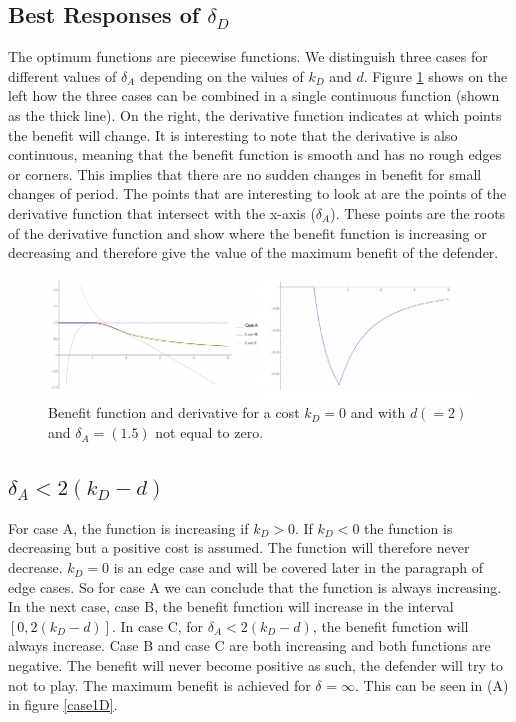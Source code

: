 \subsection{Best Responses of $\delta_{D}$}
The optimum functions are piecewise functions. We distinguish three cases for different values of $\delta_{A}$ depending on the values of $k_{D}$ and $d$. 
Figure \ref{cost0} shows on the left how the three cases can be combined in a single continuous function (shown as the thick line). On the right, the derivative function indicates at which points the benefit will change. It is interesting to note that the derivative is also continuous, meaning that the benefit function is smooth and has no rough edges or corners. This implies that there are no sudden changes in benefit for small changes of period. The points that are interesting to look at are the points of the derivative function that intersect with the x-axis ($\delta_{A}$). These points are the roots of the derivative function and show where the benefit function is increasing or decreasing and therefore give the value of the maximum benefit of the defender. 
\begin{figure}[hbtp]
\centering
\includegraphics[scale=1]{Images/cost0.pdf} 
\caption{Benefit function and derivative for a cost $k_{D} = 0$ and with $d (=2)$ and $\delta_{A}=(1.5)$ not equal to zero.}
\label{cost0}
\end{figure}
\subsection*{$\delta_{A} < 2(k_{D} - d)$}
For case A, the function is increasing if $k_{D} > 0$. If $k_{D} < 0$ the function is decreasing but a positive cost is assumed. The function will therefore never decrease. $k_{D} =0$ is an edge case and will be covered later in the paragraph of edge cases. So for case A we can conclude that the function is always increasing. In the next case, case B, the benefit function will increase in the interval $[0, 2(k_{D}-d)]$. In case C, for $\delta_{A} < 2(k_{D} - d)$, the benefit function will always increase. Case B and case C are both increasing and both functions are negative. The benefit will never become positive as such, the defender will try to not to play. The maximum benefit is achieved for $\delta_{} = \infty$. This can be seen in (A) in figure \ref{case1D}.

